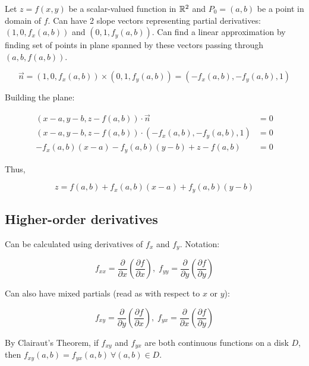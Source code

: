 Let $z=f(x,y)$ be a scalar-valued function in $\mathbb{R}^2$ and $P_0=(a,b)$ be a point in domain of $f$. Can have 2 slope vectors representing partial derivatives:
$(1,0,f_x(a,b))$ and $(0,1,f_y(a,b))$. Can find a linear approximation by finding set of points in plane spanned by these vectors passing through
$(a,b,f(a,b))$.

\[\vec{n}=(1,0,f_x(a,b))\times(0,1,f_y(a,b))=(-f_x(a,b),-f_y(a,b),1)\]

Building the plane:

\begin{align*}
    (x-a, y-b, z-f(a, b)) \cdot \vec{n} &=0 \\
    (x-a, y-b, z-f(a, b)) \cdot\left(-f_{x}(a, b),-f_{y}(a, b), 1\right) &=0 \\
    -f_{x}(a, b)(x-a)-f_{y}(a, b)(y-b)+z-f(a, b) &=0
\end{align*}

Thus,

\[z=f(a, b)+f_{x}(a, b)(x-a)+f_{y}(a, b)(y-b)\]

\subsection{Higher-order derivatives}

Can be calculated using derivatives of $f_x$ and $f_y$. Notation:

\[f_{xx}=\frac{\partial}{\partial x}(\frac{\partial f}{\partial x}),\; f_{yy}=\frac{\partial}{\partial y}(\frac{\partial f}{\partial y})\]

Can also have mixed partials (read as with respect to $x$ or $y$):

\[f_{xy}=\frac{\partial}{\partial y}(\frac{\partial f}{\partial x}),\; f_{yx}=\frac{\partial}{\partial x}(\frac{\partial f}{\partial y})\]

By Clairaut's Theorem, if $f_{xy}$ and $f_{yx}$ are both continuous functions on a disk $D$, then $f_{xy}(a,b)=f_{yx}(a,b)\: \forall (a,b)\in D$.